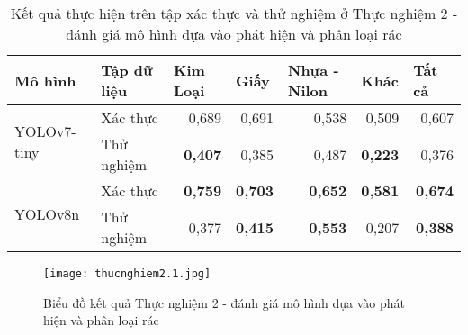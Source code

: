 \documentclass[../the.tex]{subfiles}
\begin{document}
\begin{table}[h!]
    \centering
    \caption{Kết quả thực hiện trên tập xác thực và thử nghiệm ở Thực nghiệm 2 - đánh giá mô hình dựa vào phát hiện và phân loại rác}
    \begin{tabular}{|l|l|r|r|r|r|r|}
        \hline
        \textbf{Mô hình}             & \multicolumn{1}{l|}{\textbf{Tập dữ liệu}} & \multicolumn{1}{l|}{\textbf{Kim Loại}} & \multicolumn{1}{l|}{\textbf{Giấy}} & \multicolumn{1}{l|}{\textbf{Nhựa - Nilon}} & \multicolumn{1}{l|}{\textbf{Khác}} & \multicolumn{1}{l|}{\textbf{Tất cả}} \\ \hline
        \multirow{2}{*}{YOLOv7-tiny} & Xác thực                                  & 0,689                                  & 0,691                              & 0,538                                      & 0,509                              & 0,607                                \\ \cline{2-7}
                                     & Thử nghiệm                                & \textbf{0,407}                         & 0,385                              & 0,487                                      & \textbf{0,223}                     & 0,376                                \\ \hline
        \multirow{2}{*}{YOLOv8n}     & Xác thực                                  & \textbf{0,759}                         & \textbf{0,703}                     & \textbf{0,652}                             & \textbf{0,581}                     & \textbf{0,674}                       \\ \cline{2-7}
                                     & Thử nghiệm                                & 0,377                                  & \textbf{0,415}                     & \textbf{0,553}                             & 0,207                              & \textbf{0,388}                       \\ \hline
    \end{tabular}
    \label{tab:thucnghiem2.1}
\end{table}


\begin{figure}[H]
    \centering
    \texttt{[image: thucnghiem2.1.jpg]}
    \caption{Biểu đồ kết quả Thực nghiệm 2 - đánh giá mô hình dựa vào phát hiện và phân loại rác}
    \label{fig:thucnghiem2}
\end{figure}
\end{document}
